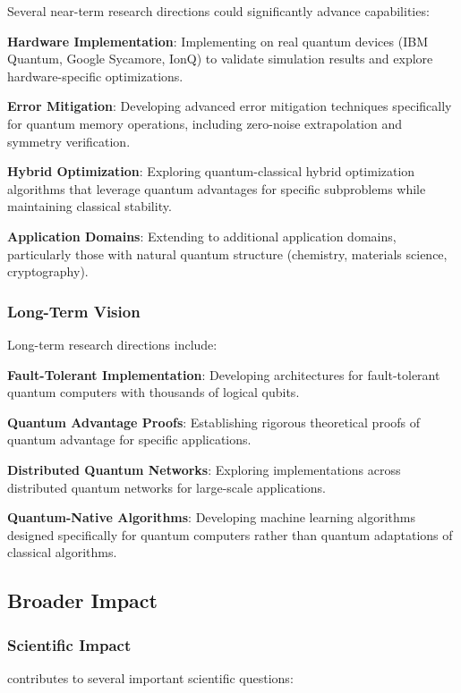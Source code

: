 Several near-term research directions could significantly advance \qmnn capabilities:

\textbf{Hardware Implementation}: Implementing \qmnn on real quantum devices (IBM Quantum, Google Sycamore, IonQ) to validate simulation results and explore hardware-specific optimizations.

\textbf{Error Mitigation}: Developing advanced error mitigation techniques specifically for quantum memory operations, including zero-noise extrapolation and symmetry verification.

\textbf{Hybrid Optimization}: Exploring quantum-classical hybrid optimization algorithms that leverage quantum advantages for specific subproblems while maintaining classical stability.

\textbf{Application Domains}: Extending \qmnn to additional application domains, particularly those with natural quantum structure (chemistry, materials science, cryptography).

\subsubsection{Long-Term Vision}

Long-term research directions include:

\textbf{Fault-Tolerant Implementation}: Developing \qmnn architectures for fault-tolerant quantum computers with thousands of logical qubits.

\textbf{Quantum Advantage Proofs}: Establishing rigorous theoretical proofs of quantum advantage for specific \qmnn applications.

\textbf{Distributed Quantum Networks}: Exploring \qmnn implementations across distributed quantum networks for large-scale applications.

\textbf{Quantum-Native Algorithms}: Developing machine learning algorithms designed specifically for quantum computers rather than quantum adaptations of classical algorithms.

\subsection{Broader Impact}

\subsubsection{Scientific Impact}

\qmnn contributes to several important scientific questions:

